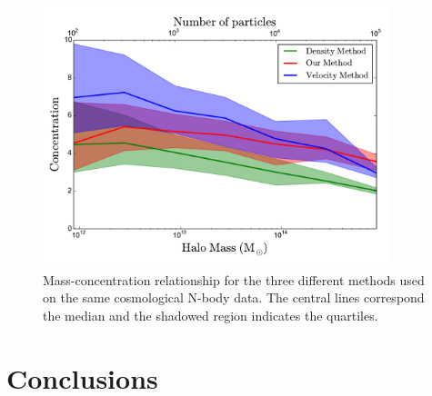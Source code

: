 \documentclass[useAMS,usenatbib]{mn2e}
\begin{document}
\begin{figure}
\begin{center}
  \includegraphics[width=0.90\textwidth]{concentration.pdf}
\end{center}
\caption{Mass-concentration relationship for the three different
  methods used on the same cosmological N-body data. The central lines
  correspond the median and the shadowed region indicates the
  quartiles.
    \label{fig:concentration}}
\end{figure}




\section{Conclusions}
\label{sec:conclusions}




\end{document}
